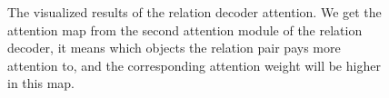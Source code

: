 \begin{figure}[h!]
	
	\caption[The visualized results of the relation decoder attention.]{The visualized results of the relation decoder attention. We get the attention map from the second attention module of the relation decoder, it means which objects the relation pair pays more attention to, and the corresponding  attention weight will be higher in this map.}
	\label{fig:relation_attetnion}
\end{figure}


